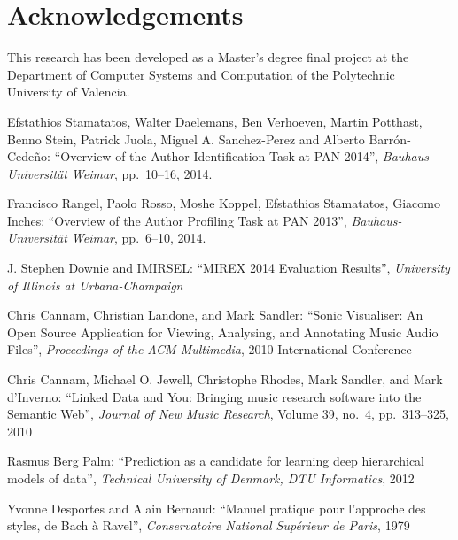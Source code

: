 \documentclass{article}
\begin{document}
\section{Acknowledgements}\label{sec:acknowledgements}
This research has been developed as a Master's degree final project at the Department of Computer Systems and Computation of the Polytechnic University of Valencia.

 

\begin{thebibliography}{citations}

Efstathios Stamatatos, Walter Daelemans, Ben Verhoeven, Martin Potthast, Benno Stein, Patrick Juola, Miguel A. Sanchez-Perez and Alberto Barrón-Cedeño:
``Overview of the Author Identification Task at PAN 2014'',
{\it Bauhaus-Universität Weimar}, 
pp.~10--16, 2014.


Francisco Rangel, Paolo Rosso, Moshe Koppel, Efstathios Stamatatos, Giacomo Inches:
``Overview of the Author Profiling Task at PAN 2013'',
{\it Bauhaus-Universität Weimar}, 
pp.~6--10, 2014.

J. Stephen Downie and IMIRSEL:
``MIREX 2014 Evaluation Results'',
{\it University of Illinois at Urbana-Champaign}

Chris Cannam, Christian Landone, and Mark Sandler:
``Sonic Visualiser: An Open Source Application for Viewing, Analysing, and Annotating Music Audio Files'',
{\it Proceedings of the ACM Multimedia},
2010 International Conference

Chris Cannam, Michael O. Jewell, Christophe Rhodes, Mark Sandler, and Mark d'Inverno:
``Linked Data and You: Bringing music research software into the Semantic Web'',
{\it Journal of New Music Research},
Volume 39, no.~4, pp.~313--325, 2010

Rasmus Berg Palm:
``Prediction as a candidate for learning deep hierarchical models of data'',
{\it Technical University of Denmark, DTU Informatics},
2012

Yvonne Desportes and Alain Bernaud:
``Manuel pratique pour l'approche des styles, de Bach à Ravel'',
{\it Conservatoire National Supérieur de Paris},
1979

\end{thebibliography}
\end{document}
